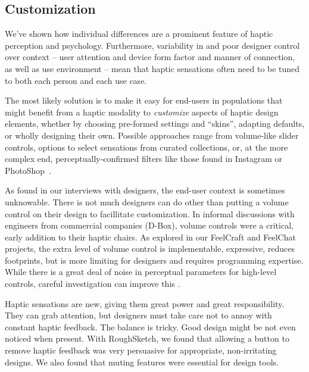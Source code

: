 \subsection{Customization}
We've shown how individual differences are a prominent feature of haptic perception and psychology.
Furthermore,  variability in and poor designer control over context --  user attention and  device form factor and manner of connection, as well as use environment -- mean that haptic sensations often need to be tuned to both each person and each use case.

The most likely solution   is to make it easy for end-users in populations that might benefit from a haptic modality to \textit{customize} aspects of haptic design elements, whether by choosing pre-formed settings and ``skins'', adapting defaults, or wholly designing their own. 
Possible approaches range from volume-like slider controls, options to select sensations from curated collections, or, at the more complex end, perceptually-confirmed filters like those found in Instagram or PhotoShop~\cite{Seifi2014,seifi2015vibviz,SchneiderAsiaHaptics2014}.


As found in our interviews with designers, the end-user context is sometimes unknowable.
There is not much designers can do other than putting a volume control on their design to facillitate customization.
In informal discussions with engineers from commercial companies (\eg D-Box), volume controls were a critical, early addition to their haptic chairs.
As explored in our FeelCraft and FeelChat projects, the extra level of volume control is implementable, expressive, reduces footprints, but is more limiting for designers and requires programming expertise.
While there is a great deal of noise in perceptual parameters for high-level controls, careful investigation can improve this \cite{Israr2014,Seifi2014}.



Haptic sensations are new, giving them great power and great responsibility.
They can grab attention, but designers must take care not to annoy with constant haptic feedback.
The balance is tricky. 
Good design might be not even noticed when present.
With RoughSketch, we found that allowing a button to remove haptic feedback was very persuasive for appropriate, non-irritating designs.
We also found that muting features were essential for \haxd design tools.






